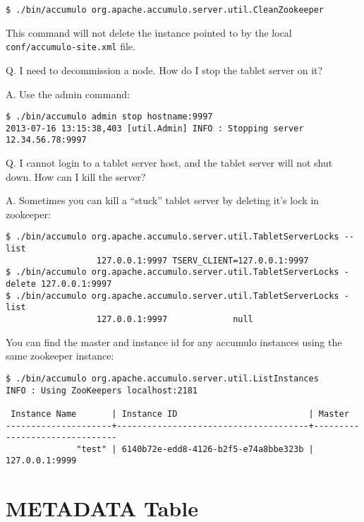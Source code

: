 \small
\begin{verbatim}
$ ./bin/accumulo org.apache.accumulo.server.util.CleanZookeeper
\end{verbatim}
\normalsize

This command will not delete the instance pointed to by the local \texttt{conf/accumulo-site.xml} file.

Q. I need to decommission a node.  How do I stop the tablet server on it?

A. Use the admin command:

\small
\begin{verbatim}
$ ./bin/accumulo admin stop hostname:9997
2013-07-16 13:15:38,403 [util.Admin] INFO : Stopping server 12.34.56.78:9997
\end{verbatim}
\normalsize

Q. I cannot login to a tablet server host, and the tablet server will not shut down.  How can I kill the server?

A. Sometimes you can kill a ``stuck'' tablet server by deleting it's lock in zookeeper:

\small
\begin{verbatim}
$ ./bin/accumulo org.apache.accumulo.server.util.TabletServerLocks --list
                  127.0.0.1:9997 TSERV_CLIENT=127.0.0.1:9997
$ ./bin/accumulo org.apache.accumulo.server.util.TabletServerLocks -delete 127.0.0.1:9997
$ ./bin/accumulo org.apache.accumulo.server.util.TabletServerLocks -list
                  127.0.0.1:9997             null
\end{verbatim}
\normalsize

You can find the master and instance id for any accumulo instances using the same zookeeper instance:

\small
\begin{verbatim}
$ ./bin/accumulo org.apache.accumulo.server.util.ListInstances
INFO : Using ZooKeepers localhost:2181

 Instance Name       | Instance ID                          | Master                        
---------------------+--------------------------------------+-------------------------------
              "test" | 6140b72e-edd8-4126-b2f5-e74a8bbe323b |                127.0.0.1:9999
\end{verbatim}
\normalsize

\section{METADATA Table}

